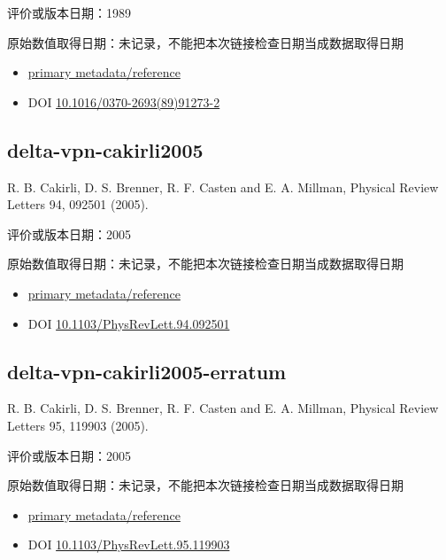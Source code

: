 \documentclass[
  11pt,
  letterpaper,
]{article}
\providecommand{\tightlist}{%
  \setlength{\itemsep}{0pt}\setlength{\parskip}{0pt}}
\begin{document}
评价或版本日期：1989

原始数值取得日期：未记录，不能把本次链接检查日期当成数据取得日期

\begin{itemize}
\tightlist
\item
  \href{https://www.sciencedirect.com/science/article/pii/0370269389912732/pdf}{primary
  metadata/reference}
\item
  DOI
  \href{https://doi.org/10.1016/0370-2693(89)91273-2}{10.1016/0370-2693(89)91273-2}
\end{itemize}

\subsection{delta-vpn-cakirli2005}\label{delta-vpn-cakirli2005}

R. B. Cakirli, D. S. Brenner, R. F. Casten and E. A. Millman, Physical
Review Letters 94, 092501 (2005).

评价或版本日期：2005

原始数值取得日期：未记录，不能把本次链接检查日期当成数据取得日期

\begin{itemize}
\tightlist
\item
  \href{https://journals.aps.org/prl/abstract/10.1103/PhysRevLett.94.092501}{primary
  metadata/reference}
\item
  DOI
  \href{https://doi.org/10.1103/PhysRevLett.94.092501}{10.1103/PhysRevLett.94.092501}
\end{itemize}

\subsection{delta-vpn-cakirli2005-erratum}\label{delta-vpn-cakirli2005-erratum}

R. B. Cakirli, D. S. Brenner, R. F. Casten and E. A. Millman, Physical
Review Letters 95, 119903 (2005).

评价或版本日期：2005

原始数值取得日期：未记录，不能把本次链接检查日期当成数据取得日期

\begin{itemize}
\tightlist
\item
  \href{https://journals.aps.org/prl/abstract/10.1103/PhysRevLett.95.119903}{primary
  metadata/reference}
\item
  DOI
  \href{https://doi.org/10.1103/PhysRevLett.95.119903}{10.1103/PhysRevLett.95.119903}
\end{itemize}
\end{document}
